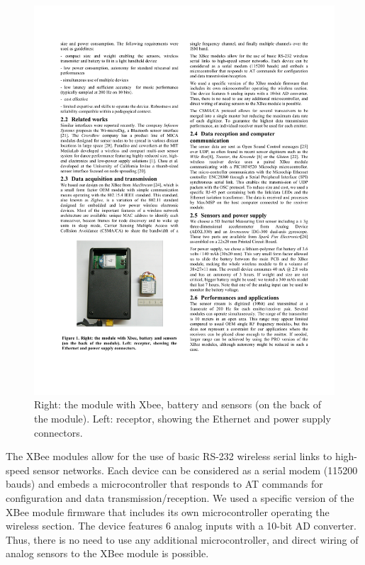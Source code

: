 \begin{figure}[t]
\center
\includegraphics[scale=1.1]{fig1.pdf}
%
%
\caption{Right: the module with Xbee, battery and sensors (on the back of the module). Left: receptor, showing the Ethernet and power supply connectors.}
\label{Bevilacqua:fig1}       %
\end{figure}

The XBee modules allow for the use of basic RS-232 wireless serial links to high-speed sensor networks. Each device can be considered as a serial modem (115200 bauds) and embeds a microcontroller that responds to AT commands for configuration and data transmission/reception. 
We used a specific version of the XBee module firmware that includes its own microcontroller operating the wireless section. The device features 6 analog inputs with a 10-bit AD converter. Thus, there is no need to use any additional microcontroller, and direct wiring of analog sensors to the XBee module is possible.

